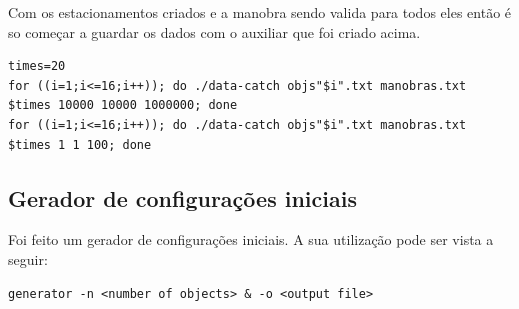 \documentclass[11pt]{article}
\begin{document}
Com os estacionamentos criados e a manobra sendo valida para todos eles então é so começar a guardar os dados com o auxiliar que foi criado acima.

\begin{lstlisting}
times=20
for ((i=1;i<=16;i++)); do ./data-catch objs"$i".txt manobras.txt $times 10000 10000 1000000; done
for ((i=1;i<=16;i++)); do ./data-catch objs"$i".txt manobras.txt $times 1 1 100; done
\end{lstlisting}

\subsection{Gerador de configurações iniciais}
\label{sec:org3a24eb2}
Foi feito um gerador de configurações iniciais. A sua utilização pode ser vista a seguir:
\begin{verbatim}
generator -n <number of objects> & -o <output file>
\end{verbatim}



\end{document}

